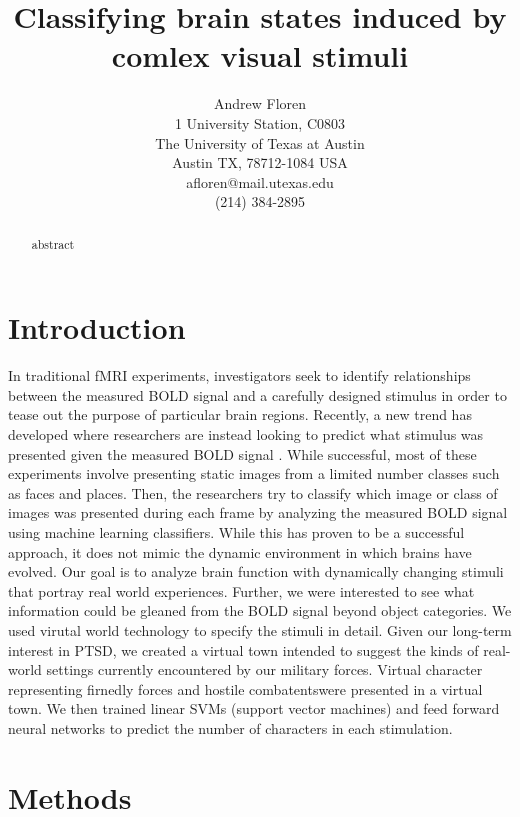 \documentclass[twocolumn,draft]{article}
\title{Classifying brain states induced by comlex visual stimuli}
\author{Andrew Floren\\
1 University Station, C0803\\
The University of Texas at Austin\\
Austin TX, 78712-1084 USA\\
afloren@mail.utexas.edu\\
(214) 384-2895\\}
\date{}
\begin{document}
\maketitle

\begin{abstract}
abstract
\end{abstract}

\tableofcontents

\section{Introduction}
In traditional fMRI experiments, investigators seek to identify relationships between the measured BOLD signal and a carefully designed stimulus in order to tease out the purpose of particular brain regions.
Recently, a new trend has developed where researchers are instead looking to predict what stimulus was presented given the measured BOLD signal \cite{Haxby2001,Mitchell2003,Haynes2006}.
While successful, most of these experiments involve presenting static images from a limited number classes such as faces and places.
Then, the researchers try to classify which image or class of images was presented during each frame by analyzing the measured BOLD signal using machine learning classifiers.
While this has proven to be a successful approach, it does not mimic the dynamic environment in which brains have evolved.
Our goal is to analyze brain function with dynamically changing stimuli that portray real world experiences.
Further, we were interested to see what information could be gleaned from the BOLD signal beyond object categories.
We used virutal world technology to specify the stimuli in detail.
Given our long-term interest in PTSD, we created a virtual town intended to suggest the kinds of real-world settings currently encountered by our military forces.
Virtual character representing firnedly forces and hostile combatentswere presented in a virtual town.
We then trained linear SVMs (support vector machines) and feed forward neural networks to predict the number of characters in each stimulation.

\section{Methods}
\end{document}
